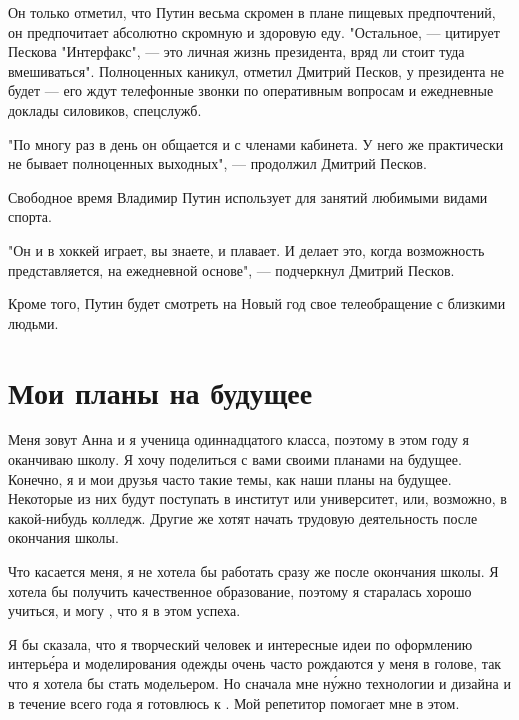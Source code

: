 Он только отметил, что Путин весьма скромен в плане пищевых предпочтений, он предпочитает абсолютно скромную и здоровую еду. "Остальное, --- цитирует Пескова "Интерфакс", --- это личная жизнь президента, вряд ли стоит туда вмешиваться".
Полноценных каникул, отметил Дмитрий Песков, у президента не будет --- его ждут телефонные звонки по оперативным вопросам и ежедневные доклады силовиков, спецслужб.

"По многу раз в день он общается и с членами кабинета. У него же практически не бывает полноценных выходных", --- продолжил Дмитрий Песков.

Свободное время Владимир Путин использует для занятий любимыми видами спорта.

"Он и в хоккей играет, вы знаете, и плавает. И делает это, когда возможность представляется, на ежедневной основе", --- подчеркнул Дмитрий Песков.

Кроме того, Путин будет смотреть на Новый год свое телеобращение с близкими людьми.


\section{Мои планы на будущее}
Меня зовут Анна и я ученица одиннадцатого класса, поэтому в этом году я оканчиваю школу. Я хочу поделиться с вами своими планами на будущее. Конечно, я и мои друзья часто  такие темы, как наши планы на будущее. Некоторые из них будут поступать в институт или университет, или, возможно, в какой-нибудь колледж. Другие же хотят начать трудовую деятельность после окончания школы.

Что касается меня, я не хотела бы работать сразу же после окончания школы. Я хотела бы получить качественное образование, поэтому я старалась хорошо учиться, и могу  , что я  в этом успеха.

Я бы сказала, что я творческий человек  и интересные идеи по оформлению интерь\'{е}ра и моделирования одежды очень часто рождаются у меня в голове, так что я хотела бы стать модельером. Но сначала мне н\'{у}жно  технологии и дизайна и в течение всего года я  готовлюсь к . Мой репетитор помогает мне в этом.

